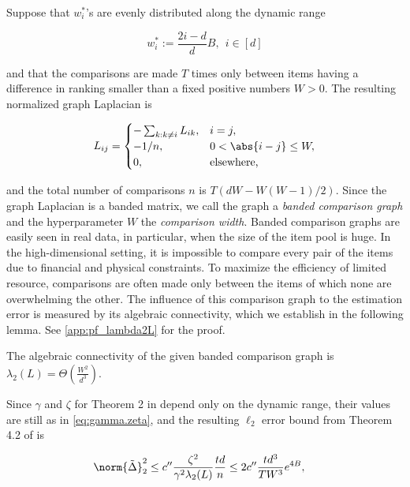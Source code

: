 Suppose that $w^*_i$'s are evenly distributed along the dynamic range

\begin{equation}\label{eq:even_dist_players}
    w^*_i := \frac{2i-d}{d}B, ~~ i \in [d]
\end{equation}

and that the comparisons are made $T$ times only between items having a difference in ranking smaller than a fixed positive numbers $W > 0$. The resulting normalized graph Laplacian is

\begin{equation} \label{eq:laplacian}
    L_{ij} = \begin{cases}
    -\sum_{k: k \neq i} L_{ik}, & i = j, \\
    -1/n, & 0 < \abs{i - j} \leq W, \\
    0, & \text{elsewhere,}
    \end{cases}
\end{equation}

and the total number of comparisons $n$ is $T(dW-W(W-1)/2)$. Since the graph Laplacian is a banded matrix, we call the graph a {\it banded comparison graph} and the hyperparameter $W$ the {\it comparison width}. Banded comparison graphs are easily seen in real data, in particular, when the size of the item pool is huge. In the high-dimensional setting, it is impossible to compare every pair of the items due to financial and physical constraints. To maximize the efficiency of limited resource, comparisons are often made only between the items of which none are overwhelming the other. The influence of this comparison graph to the estimation error is measured by its algebraic connectivity, which we establish in the following lemma. See \ref{app:pf_lambda2L} for the proof.

\begin{lemma} \label{lem:lambda2L}
    The algebraic connectivity of the given banded comparison graph is $
        \lambda_2(L) 

        = \Theta\left(\frac{W^2}{d^3}\right)
    $.
\end{lemma}

Since $\gamma$ and $\zeta$ for Theorem 2 in \citet{shah2016estimation} depend only on the dynamic range, their values are still as in \eqref{eq:gamma.zeta}, and the resulting $\ell_2$ error bound from Theorem 4.2 of \citet{shah2016estimation} is

\begin{equation}
\begin{split}
    \norm{\tilde{\Delta}}_2^2 \leq c'' \frac{\zeta^2}{\gamma^2\lambda_2(L)} \frac{td}{n} 

    & \leq 2 c'' \frac{td^3}{TW^3} e^{4B},
\end{split}
\end{equation}

